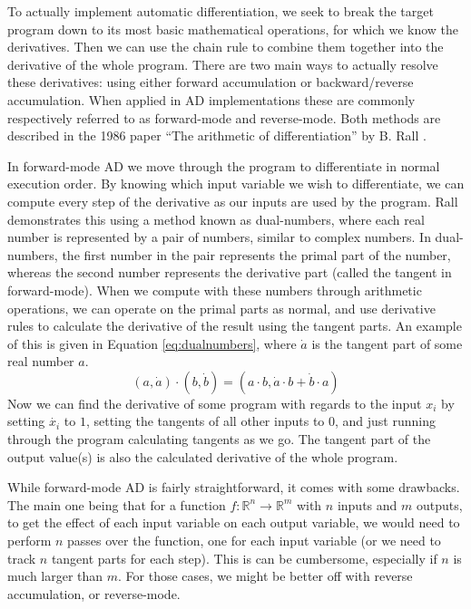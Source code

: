         To actually implement automatic differentiation, we seek to break the target program down to its most basic mathematical operations, for which we know the derivatives.
        Then we can use the chain rule to combine them together into the derivative of the whole program.
        There are two main ways to actually resolve these derivatives: using either forward accumulation or backward/reverse accumulation.
        When applied in AD implementations these are commonly respectively referred to as forward-mode and reverse-mode.
        Both methods are described in the 1986 paper ``The arithmetic of differentiation'' by B. Rall \cite{rall1986arithmetic}.
        
        In forward-mode AD we move through the program to differentiate in normal execution order.
        By knowing which input variable we wish to differentiate, we can compute every step of the derivative as our inputs are used by the program.
        Rall demonstrates this using a method known as dual-numbers, where each real number is represented by a pair of numbers, similar to complex numbers.
        In dual-numbers, the first number in the pair represents the primal part of the number, whereas the second number represents the derivative part (called the tangent in forward-mode).
        When we compute with these numbers through arithmetic operations, we can operate on the primal parts as normal, and use derivative rules to calculate the derivative of the result using the tangent parts.
        An example of this is given in Equation \ref{eq:dualnumbers}, where $\dot{a}$ is the tangent part of some real number $a$.
        \begin{equation} \label{eq:dualnumbers}
            (a,\dot{a})\cdot(b,\dot{b})=(a\cdot b, \dot{a}\cdot b+\dot{b}\cdot a)
        \end{equation}
        Now we can find the derivative of some program with regards to the input $x_i$ by setting $\dot{x_i}$ to $1$, setting the tangents of all other inputs to $0$, and just running through the program calculating tangents as we go.
        The tangent part of the output value(s) is also the calculated derivative of the whole program.

        While forward-mode AD is fairly straightforward, it comes with some drawbacks.
        The main one being that for a function $f:\mathbb{R}^n\to\mathbb{R}^m$ with $n$ inputs and $m$ outputs, to get the effect of each input variable on each output variable, we would need to perform $n$ passes over the function, one for each input variable (or we need to track $n$ tangent parts for each step).
        This is can be cumbersome, especially if $n$ is much larger than $m$.
        For those cases, we might be better off with reverse accumulation, or reverse-mode.

